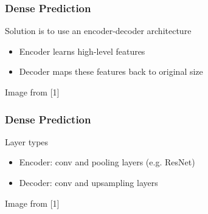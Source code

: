 \documentclass[xetex,professionalfont]{beamer}
\renewcommand\emph[1]{\textcolor{tuwcvl_cvl_blue}{#1}}
\begin{document}
\begin{frame}
	\frametitle{Dense Prediction}

	Solution is to use an \emph{encoder-decoder architecture}
	\begin{itemize}
		\item \emph{Encoder} learns high-level features
		\item \emph{Decoder} maps these features back to original size
	\end{itemize}

	\medskip

	\begin{center}
		{\centering Image from [1]}
	\end{center}

\end{frame}


\begin{frame}
	\frametitle{Dense Prediction}

	Layer types
	\begin{itemize}
		\item Encoder: conv and pooling layers (e.g. ResNet)
		\item Decoder: conv and \emph{upsampling} layers
	\end{itemize}

	\medskip

	\begin{center}
		{\centering Image from [1]}
	\end{center}

\end{frame}
\end{document}
